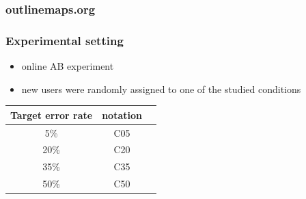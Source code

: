 \documentclass[bigger]{beamer}
\begin{document}
\begin{frame}
	\frametitle{outlinemaps.org}
\end{frame}

\begin{frame}
  \frametitle{Experimental setting}
	\begin{itemize}
		\item online AB experiment
		\item new users were randomly assigned to one of the studied conditions
	\end{itemize}
	\begin{center}
		\begin{tabular}{ccc}
			\textbf{Target error rate} & \textbf{notation} \\
			\toprule
			 5\% & C05 \\
			 20\%   & C20 \\
			 35\% & C35 \\
			 50\%   & C50 \\
			\bottomrule
		\end{tabular}
	\end{center}

\end{frame}
\end{document}
